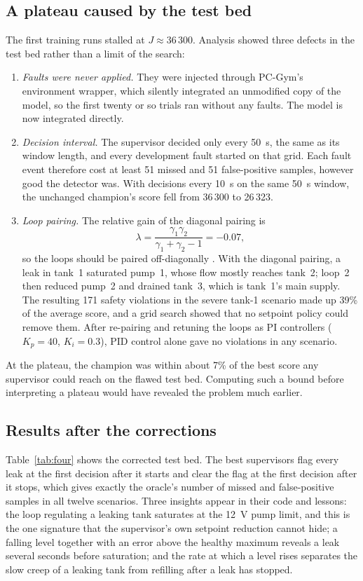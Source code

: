 \subsection{A plateau caused by the test bed}
The first training runs stalled at $J \approx 36\,300$. Analysis showed
three defects in the test bed rather than a limit of the search:
\begin{enumerate}
\item \emph{Faults were never applied.} They were injected through PC-Gym's
  environment wrapper, which silently integrated an unmodified copy of the
  model, so the first twenty or so trials ran without any faults. The model
  is now integrated directly.
\item \emph{Decision interval.} The supervisor decided only every 50~s, the
  same as its window length, and every development fault started on that
  grid. Each fault event therefore cost at least 51 missed and 51
  false-positive samples, however good the detector was. With decisions
  every 10~s on the same 50~s window, the unchanged champion's score fell
  from 36\,300 to 26\,323.
\item \emph{Loop pairing.} The relative gain of the diagonal pairing is
  \begin{equation*}
    \lambda = \frac{\gamma_1\gamma_2}{\gamma_1+\gamma_2-1} = -0.07 ,
  \end{equation*}
  so the loops should be paired off-diagonally \cite{johansson2000}. With the
  diagonal pairing, a leak in tank~1 saturated pump~1, whose flow mostly
  reaches tank~2; loop~2 then reduced pump~2 and drained tank~3, which is
  tank~1's main supply. The resulting 171 safety violations in the severe
  tank-1 scenario made up 39\% of the average score, and a grid search showed
  that no setpoint policy could remove them. After re-pairing and retuning
  the loops as PI controllers ($K_p = 40$, $K_i = 0.3$), PID control alone
  gave no violations in any scenario.
\end{enumerate}
At the plateau, the champion was within about 7\% of the best score any
supervisor could reach on the flawed test bed. Computing such a bound before
interpreting a plateau would have revealed the problem much earlier.

\subsection{Results after the corrections}
Table~\ref{tab:four} shows the corrected test bed. The best supervisors flag
every leak at the first decision after it starts and clear the flag at the
first decision after it stops, which gives exactly the oracle's number of
missed and false-positive samples in all twelve scenarios. Three insights
appear in their code and lessons: the loop regulating a leaking tank
saturates at the 12~V pump limit, and this is the one signature that the
supervisor's own setpoint reduction cannot hide; a falling level together
with an error above the healthy maximum reveals a leak several seconds
before saturation; and the rate at which a level rises separates the slow
creep of a leaking tank from refilling after a leak has stopped.

